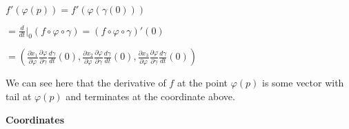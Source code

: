 \documentclass[12pt, a4paper]{article}
\begin{document}
\vspace{5mm}

\centerline{$f'(\varphi(p))=f'(\varphi(\gamma(0)))$}
\vspace{2mm}
\centerline{$=\frac{d}{dt}\Big|_0 (f\circ\varphi\circ\gamma)=(f\circ\varphi\circ\gamma)'(0)$}
\vspace{2mm}
\centerline{\Large{$=(\frac{\partial x_1}{\partial \varphi}\frac{\partial \varphi}{\partial \gamma}\frac{d\gamma}{dt}(0),\frac{\partial x_2}{\partial \varphi}\frac{\partial \varphi}{\partial \gamma}\frac{d\gamma}{dt}(0),\frac{\partial x_3}{\partial \varphi}\frac{\partial \varphi}{\partial \gamma}\frac{d\gamma}{dt}(0))$}}

\vspace{5mm}

\normalsize

We can see here that the derivative of $f$ at the point $\varphi(p)$ is some vector with tail at $\varphi(p)$ and terminates at the coordinate above. 

\newpage

\centerline{\textbf{Coordinates}}

\vspace{4mm}
\end{document}
